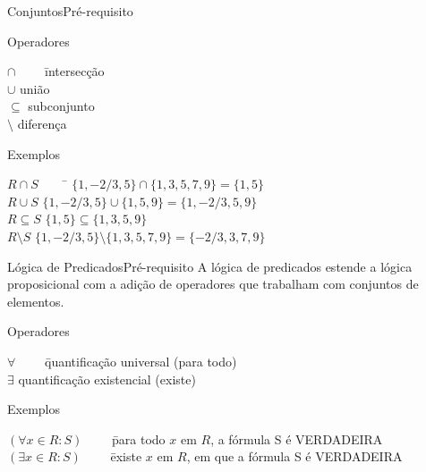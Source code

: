 \begin{frame}{Conjuntos}{Pré-requisito}

  \begin{block}{Operadores}
    \begin{tabbing}
        $\cap\qquad$ \= intersecção \\
        $\cup$  \> união \\
        $\subseteq$ \> subconjunto \\
        $\setminus$ \> diferença \\
      \end{tabbing}
  \end{block}

    \pause
    \begin{block}{Exemplos}\tiny
      \begin{tabbing}
        $R\cap S\qquad$ \= $\{1, -2/3, 5\}\cap\{1,3,5,7,9\} = \{1,5\} $ \\
        $R\cup S$  \> $\{1, -2/3, 5\}\cup\{1,5,9\} = \{1,-2/3,5,9\} $ \\
        $R\subseteq S$ \> $\{1, 5\}\subseteq\{1,3,5,9\}$ \\
        $R\setminus S$ \> $\{1, -2/3, 5\}\setminus\{1,3,5,7,9\} = \{-2/3,3,7,9\} $ \\
      \end{tabbing}
    \end{block}

\end{frame}

\begin{frame}{Lógica de Predicados}{Pré-requisito}
  A lógica de predicados estende a lógica proposicional com
  a adição de operadores que trabalham com conjuntos de elementos.

  \begin{block}{Operadores}
    \begin{tabbing}
        $\forall\qquad$ \= quantificação universal (para todo) \\
        $\exists$  \> quantificação existencial (existe) \\
      \end{tabbing}
  \end{block}

    \pause
    \begin{block}{Exemplos}\tiny
      \begin{tabbing}
        $ (\forall x \in R: S) \qquad$ \= para todo $x$ em $R$, a fórmula S é {\sc VERDADEIRA} \\
        $ (\exists x \in R: S) \qquad$ \= existe $x$ em $R$, em que a fórmula S é {\sc VERDADEIRA} \\
      \end{tabbing}
    \end{block}

\end{frame}

